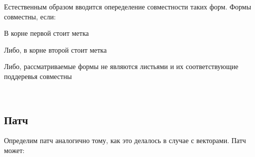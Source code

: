 Естественным образом вводится опеределение совместности таких форм.
Формы совместны, если:

\begin{code}%
\>  \AgdaSymbol{:}      \<%
\end{code}

В корне первой стоит метка 

\begin{code}%
\>[0]\<[2]%
\>[2] \AgdaSymbol{:} \AgdaSymbol{(} \AgdaSymbol{:} \AgdaSymbol{)}    \<%
\end{code}

Либо, в корне второй стоит метка 

\begin{code}%
\>[0]\<[2]%
\>[2] \AgdaSymbol{:} \AgdaSymbol{(} \AgdaSymbol{:} \AgdaSymbol{)}    \<%
\end{code}

Либо, рассматриваемые формы не являются листьями и их соответствующие
поддеревья совместны

\begin{code}%
\>[0]\<[2]%
\>[2] \AgdaSymbol{:}  \AgdaSymbol{\{}    \AgdaSymbol{:} \AgdaSymbol{\}}         \<[56]%
\>[56]\<%
\\
\>[2]\<[4]%
\>[4]       \<%
\end{code}
    
\subsection{Патч}

Определим патч аналогично тому, как это делалось в случае с векторами.
Патч может:

